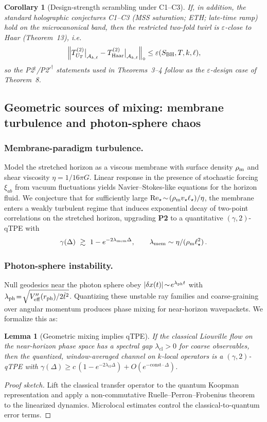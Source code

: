 \documentclass[11pt,a4paper]{article}
\newcommand{\Ptwo}{\textbf{P2}\xspace}
\theoremstyle{plain}
\newtheorem{lemma}[theorem]{Lemma}
\newtheorem{corollary}[theorem]{Corollary}
\theoremstyle{definition}
\theoremstyle{remark}
\begin{document}
\begin{corollary}[Design-strength scrambling under C1--C3]\label{cor:A3-design}
If, in addition, the standard holographic conjectures C1--C3 (MSS saturation; ETH; late-time ramp) hold on the microcanonical band, then the restricted two-fold twirl is $\varepsilon$-close to Haar (Theorem~13), i.e.
\[
\left\| T^{(2)}_{U_T}\big|_{\mathcal A_{k,\ell}} - T^{(2)}_{\mathrm{Haar}}\big|_{\mathcal A_{k,\ell}}\right\|_\diamond \le \varepsilon(S_{\rm BH},T,k,\ell),
\]
so the P2$^\dagger$/P2$'^\dagger$ statements used in Theorems~3--4 follow as the $\varepsilon$-design case of Theorem~8.
\end{corollary}


\subsection*{Geometric sources of mixing: membrane turbulence and photon-sphere chaos}
\label{sec:geom-mix}
\subsubsection{Membrane-paradigm turbulence.}
Model the stretched horizon as a viscous membrane with surface density $\rho_{\rm m}$ and shear viscosity $\eta=1/16\pi G$.
Linear response in the presence of stochastic forcing $\xi_{ab}$ from vacuum fluctuations yields Navier--Stokes-like equations for the horizon fluid.
We conjecture that for sufficiently large $\mathrm{Re}_\star\!\sim\!(\rho_{\rm m} v_\star \ell_\star)/\eta$, the membrane enters a weakly turbulent regime that induces exponential decay of two-point correlations on the stretched horizon, upgrading \Ptwo{} to a quantitative $(\gamma,2)$-qTPE with
\begin{equation}
\gamma(\Delta)\ \gtrsim\ 1-e^{-2\lambda_{\rm mem}\Delta},\qquad \lambda_{\rm mem}\sim \eta/(\rho_{\rm m}\ell_\star^2)\,.
\end{equation}
\subsubsection{Photon-sphere instability.}
Null geodesics near the photon sphere obey $|\delta x(t)|\!\sim\! e^{\lambda_{\rm ph} t}$ with $\lambda_{\rm ph}\!=\!\sqrt{V''_{\rm eff}(r_{\rm ph})/2\dot{t}^2}$.
Quantizing these unstable ray families and coarse-graining over angular momentum produces phase mixing for near-horizon wavepackets.
We formalize this as:
\begin{lemma}[Geometric mixing implies qTPE]
If the classical Liouville flow on the near-horizon phase space has a spectral gap $\lambda_\mathrm{cl}>0$ for coarse observables, then the quantized, window-averaged channel on $k$-local operators is a $(\gamma,2)$-qTPE with $\gamma(\Delta)\!\ge\! c\,(1-e^{-2\lambda_\mathrm{cl}\Delta})+O(e^{-\mathrm{const}\cdot \Delta})$.
\end{lemma}
\begin{proof}[Proof sketch]
Lift the classical transfer operator to the quantum Koopman representation and apply a non-commutative Ruelle--Perron--Frobenius theorem to the linearized dynamics.
Microlocal estimates control the classical-to-quantum error terms.
\end{proof}
\end{document}
